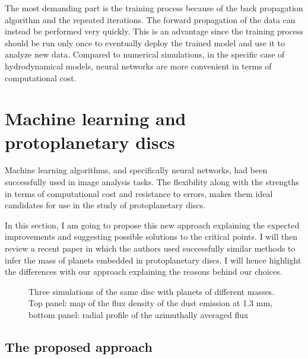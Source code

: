 \documentclass[a4paper,10pt]{report}
\begin{document}
The most demanding part is the training process because of the back propagation 
algorithm and the repeated iterations.
The forward propagation of the data can instead be performed  very quickly.
This is an advantage since the training process should be run only once to eventually deploy the trained model
and use it to analyze new data. Compared to numerical simulations, in the specific case of hydrodynamical models, 
neural networks are more convenient in terms of computational cost.

\section{Machine learning and protoplanetary discs}

Machine learning algorithms, and specifically neural networks, had been successfully used in image analysis tasks.
The flexibility along with the strengths in terms of computational cost and resistance to 
errors, makes them ideal candidates for use in the study of protoplanetary discs.

In this section, I am going to propose this new approach explaining the expected improvements and 
suggesting possible solutions to the critical points. I will then review a recent paper in which the 
authors used successfully similar methods to infer the mass of planets embedded in protoplanetary discs.
I will hence highlight the differences with our approach explaining the reasons behind our choices.

\begin{figure}
    \begin{center}
        \scalebox{0.5}{}
        \scalebox{0.6}{}
    \end{center}
    \caption{Three simulations of the same disc with planets of different masses.
    Top panel: map of the flux density of the dust emission at 1.3 mm, bottom panel:
    radial profile of the azimuthally averaged flux}
\end{figure}

\subsection{The proposed approach}
\end{document}
